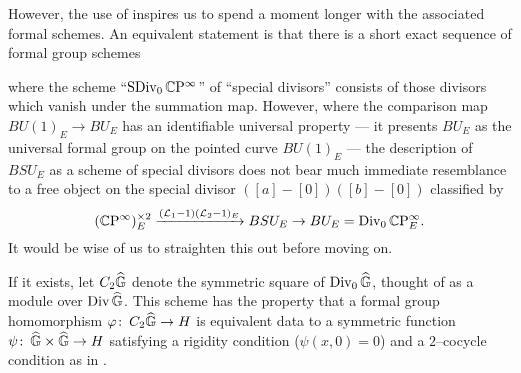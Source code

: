 However, the use of  inspires us to spend a moment longer with the associated formal schemes.  An equivalent statement is that there is a short exact sequence of formal group schemes
\begin{center}
\end{center}
where the scheme ``$\operatorname{SDiv}_0 \mathbb{C}\mathrm P^\infty$'' of ``special divisors'' consists of those divisors which vanish under the summation map.  However, where the comparison map $BU(1)_E \to BU_E$ has an identifiable universal property --- it presents $BU_E$ as the universal formal group on the pointed curve $BU(1)_E$ --- the description of $BSU_E$ as a scheme of special divisors does not bear much immediate resemblance to a free object on the special divisor $([a] - [0])([b] - [0])$ classified by \[(\mathbb{C}\mathrm P^\infty)^{\times 2}_E \xrightarrow{(\mathcal{L}_1 - 1)(\mathcal{L}_2 - 1)_E} BSU_E \to BU_E = \operatorname{Div}_0 \mathbb{C}\mathrm P^\infty_E.\]  It would be wise of us to straighten this out before moving on.

\begin{definition}\label{DefinitionOfC2G}
If it exists, let $C_2 \widehat{\mathbb G}$ denote the symmetric square of $\operatorname{Div}_0 \widehat{\mathbb G}$, thought of as a module over $\operatorname{Div} \widehat{\mathbb G}$.  This scheme has the property that a formal group homomorphism $\varphi\colon\thinspace C_2 \widehat{\mathbb G} \to H$ is equivalent data to a symmetric function $\psi\colon\thinspace \widehat{\mathbb G} \times \widehat{\mathbb G} \to H$ satisfying a rigidity condition ($\psi(x, 0) = 0$) and a $2$--cocycle condition as in .
\end{definition}


